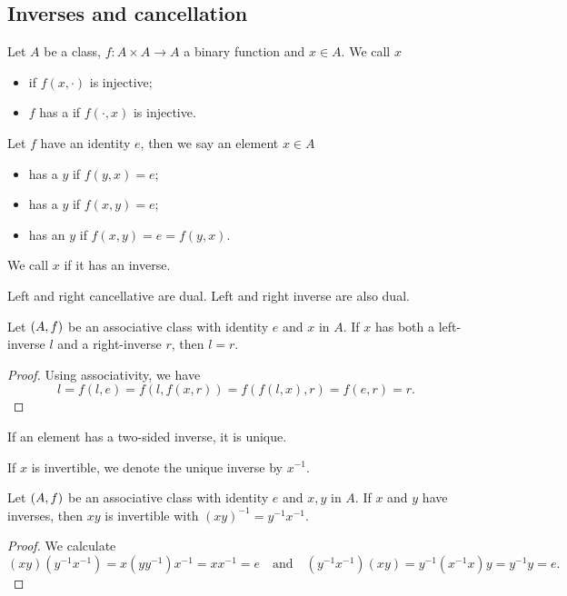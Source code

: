 \subsection{Inverses and cancellation}
\begin{definition}
Let $A$ be a class, $f: A\times A \to A$ a binary function and $x\in A$. 
We call $x$
\begin{itemize}
\item {} if $f(x,\cdot)$ is injective;
\item $f$ has a  if $f(\cdot, x)$ is injective.
\end{itemize}
Let $f$ have an identity $e$, then we say an element $x\in A$
\begin{itemize}
\item has a  $y$ if $f(y,x) = e$;
\item has a  $y$ if $f(x,y) = e$;
\item has an  $y$ if $f(x,y) = e = f(y,x)$.
\end{itemize}
We call $x$  if it has an inverse.
\end{definition}

Left and right cancellative are dual. Left and right inverse are also dual.

\begin{proposition} \label{leftRightInverse}
Let $\left( A, f \right)$ be an associative class with identity $e$ and $x$ in $A$. If $x$ has both a left-inverse $l$ and a right-inverse $r$, then $l = r$.
\end{proposition}
\begin{proof}
Using associativity, we have
\[ l = f(l,e) = f(l, f(x,r)) = f(f(l,x), r) = f(e, r) = r. \]
\end{proof}
\begin{corollary}
If an element has a two-sided inverse, it is unique.
\end{corollary}
If $x$ is invertible, we denote the unique inverse by $x^{-1}$.

\begin{proposition}
Let $\left( A, f \right)$ be an associative class with identity $e$ and $x,y$ in $A$. If $x$ and $y$ have inverses, then $xy$ is invertible with $(xy)^{-1} = y^{-1}x^{-1}$.
\end{proposition}
\begin{proof}
We calculate
\[ (xy)(y^{-1}x^{-1}) = x(yy^{-1})x^{-1} = xx^{-1} = e \quad\text{and}\quad (y^{-1}x^{-1})(xy) = y^{-1}(x^{-1}x)y = y^{-1}y = e. \]
\end{proof}

